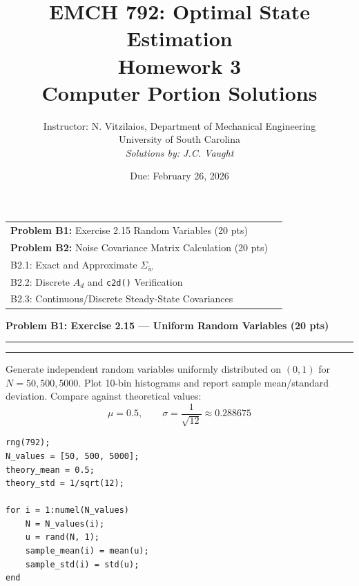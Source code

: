\documentclass[12pt]{article}
\title{EMCH 792: Optimal State Estimation \\ Homework 3 \\ \large{Computer Portion Solutions}}
\author{Instructor: N. Vitzilaios, Department of Mechanical Engineering \\ University of South Carolina \\ \textit{Solutions by: J.C. Vaught}}
\date{Due: February 26, 2026}
\newcommand{\question}[1]{%
  \clearpage
  \vspace{0.5cm}
  {\noindent\normalsize \textbf{#1}}
  \vspace{0.2cm}
  \hrule
  \vspace{0.1cm}
  \hrule
  \vspace{0.3cm}
}
\begin{document}
\maketitle
\setlength{\parindent}{0pt}

\begin{center}
\begin{tcolorbox}[colback=white, colframe=gray!50!black, colbacktitle=gray!20!white,
                  coltitle=black, sharp corners, boxrule=1pt,
                  title=\Large\bfseries Table of Contents]
\begin{tabular}{p{}r}
\textbf{Problem B1:} Exercise 2.15 Random Variables (20 pts) \dotfill & \textbf{\pageref{prob:b1}} \\[0.3em]
\textbf{Problem B2:} Noise Covariance Matrix Calculation (20 pts) \dotfill & \textbf{\pageref{prob:b2}} \\[0.3em]
\quad B2.1: Exact and Approximate $\Sigma_{\tilde w}$ \dotfill & \textbf{\pageref{prob:b2a}} \\[0.3em]
\quad B2.2: Discrete $A_d$ and \texttt{c2d()} Verification \dotfill & \textbf{\pageref{prob:b2b}} \\[0.3em]
\quad B2.3: Continuous/Discrete Steady-State Covariances \dotfill & \textbf{\pageref{prob:b2c}} \\
\end{tabular}
\vspace{0.2cm}
\end{tcolorbox}
\end{center}

\question{Problem B1: Exercise 2.15 --- Uniform Random Variables (20 pts)}\label{prob:b1}
Generate independent random variables uniformly distributed on $(0,1)$ for $N=50, 500, 5000$. Plot 10-bin histograms and report sample mean/standard deviation. Compare against theoretical values:
\[
\mu = 0.5, \qquad \sigma = \frac{1}{\sqrt{12}} \approx 0.288675
\]

\begin{codebox}
\begin{lstlisting}
rng(792);
N_values = [50, 500, 5000];
theory_mean = 0.5;
theory_std = 1/sqrt(12);

for i = 1:numel(N_values)
    N = N_values(i);
    u = rand(N, 1);
    sample_mean(i) = mean(u);
    sample_std(i) = std(u);
end
\end{lstlisting}
\end{codebox}
\end{document}
